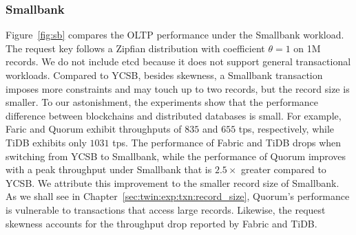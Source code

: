 \subsubsection{Smallbank}

Figure~\ref{fig:sb} compares the OLTP performance under the Smallbank workload.
The request key follows a Zipfian distribution with coefficient $\theta=1$ on 1M
records.
We do not include etcd because it does not support general transactional
workloads.
Compared to YCSB, besides skewness, a Smallbank transaction imposes more
constraints and may touch up to two records, but the record size is smaller.
To our astonishment, the experiments show that the performance difference
between blockchains and distributed databases is small. For example, Faric and
Quorum exhibit throughputs of $835$ and $655$ tps, respectively, while TiDB
exhibits only $1031$ tps.
The performance of Fabric and TiDB drops when switching from YCSB to Smallbank,
while the performance of Quorum improves with a peak throughput under Smallbank
that is $2.5\times$ greater compared to YCSB.
We attribute this improvement to the smaller record size of Smallbank.
As we shall see in Chapter~\ref{sec:twin:exp:txn:record_size}, Quorum's performance
is vulnerable to transactions that access large records.
Likewise, the request skewness accounts for the throughput drop reported by Fabric and TiDB. 

